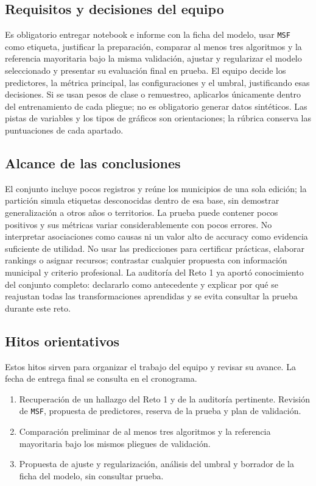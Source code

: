 \documentclass[a4,11pt]{aleph-notas}
\begin{document}
\subsection*{Requisitos y decisiones del equipo}
Es obligatorio entregar notebook e informe con la ficha del modelo, usar \texttt{MSF} como etiqueta, justificar la preparación, comparar al menos tres algoritmos y la referencia mayoritaria bajo la misma validación, ajustar y regularizar el modelo seleccionado y presentar su evaluación final en prueba. El equipo decide los predictores, la métrica principal, las configuraciones y el umbral, justificando esas decisiones. Si se usan pesos de clase o remuestreo, aplicarlos únicamente dentro del entrenamiento de cada pliegue; no es obligatorio generar datos sintéticos. Las pistas de variables y los tipos de gráficos son orientaciones; la rúbrica conserva las puntuaciones de cada apartado.

\subsection*{Alcance de las conclusiones}
El conjunto incluye pocos registros y reúne los municipios de una sola edición; la partición simula etiquetas desconocidas dentro de esa base, sin demostrar generalización a otros años o territorios. La prueba puede contener pocos positivos y sus métricas variar considerablemente con pocos errores. No interpretar asociaciones como causas ni un valor alto de accuracy como evidencia suficiente de utilidad. No usar las predicciones para certificar prácticas, elaborar rankings o asignar recursos; contrastar cualquier propuesta con información municipal y criterio profesional. La auditoría del Reto 1 ya aportó conocimiento del conjunto completo: declararlo como antecedente y explicar por qué se reajustan todas las transformaciones aprendidas y se evita consultar la prueba durante este reto.

\subsection*{Hitos orientativos}
Estos hitos sirven para organizar el trabajo del equipo y revisar su avance. La fecha de entrega final se consulta en el cronograma.
\begin{enumerate}[leftmargin=*, label={\textbf{Hito \arabic*.}}]
    \item Recuperación de un hallazgo del Reto 1 y de la auditoría pertinente. Revisión de \texttt{MSF}, propuesta de predictores, reserva de la prueba y plan de validación.
    \item Comparación preliminar de al menos tres algoritmos y la referencia mayoritaria bajo los mismos pliegues de validación.
    \item Propuesta de ajuste y regularización, análisis del umbral y borrador de la ficha del modelo, sin consultar prueba.
\end{enumerate}
\end{document}

